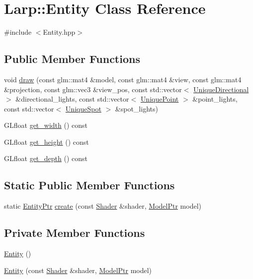 \hypertarget{classLarp_1_1Entity}{}\section{Larp\+:\+:Entity Class Reference}
\label{classLarp_1_1Entity}


{\ttfamily \#include $<$Entity.\+hpp$>$}

\subsection*{Public Member Functions}
\begin{DoxyCompactItemize}
\item 
void \hyperlink{classLarp_1_1Entity_a8e468fc1ef2564870577d34995597243}{draw} (const glm\+::mat4 \&model, const glm\+::mat4 \&view, const glm\+::mat4 \&projection, const glm\+::vec3 \&view\+\_\+pos, const std\+::vector$<$ \hyperlink{namespaceLarp_af87ce889468b60d51aa1479335ba19bf}{Unique\+Directional} $>$ \&directional\+\_\+lights, const std\+::vector$<$ \hyperlink{namespaceLarp_acd7cacff15535544525abc2e90e07b91}{Unique\+Point} $>$ \&point\+\_\+lights, const std\+::vector$<$ \hyperlink{namespaceLarp_a288b58c470c3ed41d3b23e764ba5b6eb}{Unique\+Spot} $>$ \&spot\+\_\+lights)
\item 
G\+Lfloat \hyperlink{classLarp_1_1Entity_a7f4fee67776ac0f0b1fa8d499cafe46e}{get\+\_\+width} () const 
\item 
G\+Lfloat \hyperlink{classLarp_1_1Entity_a26ae62c497eb781a8bf3f9235c8516f4}{get\+\_\+height} () const 
\item 
G\+Lfloat \hyperlink{classLarp_1_1Entity_af0a2bd06ec666ce59bba9db6da7f87a8}{get\+\_\+depth} () const 
\end{DoxyCompactItemize}
\subsection*{Static Public Member Functions}
\begin{DoxyCompactItemize}
\item 
static \hyperlink{namespaceLarp_a775efcc4cabb308d50168c52df343353}{Entity\+Ptr} \hyperlink{classLarp_1_1Entity_a394ed6e14315dec6251bbb3a624423c4}{create} (const \hyperlink{classLarp_1_1Shader}{Shader} \&shader, \hyperlink{namespaceLarp_a1fbc1dec59f7a571dc06e152b1e7d38c}{Model\+Ptr} model)
\end{DoxyCompactItemize}
\subsection*{Private Member Functions}
\begin{DoxyCompactItemize}
\item 
\hyperlink{classLarp_1_1Entity_ad4b4badc7c5cb0fc6b3f2dc3525060e8}{Entity} ()
\item 
\hyperlink{classLarp_1_1Entity_a549a7421654fd71dc869febc722a8023}{Entity} (const \hyperlink{classLarp_1_1Shader}{Shader} \&shader, \hyperlink{namespaceLarp_a1fbc1dec59f7a571dc06e152b1e7d38c}{Model\+Ptr} model)
\end{DoxyCompactItemize}
